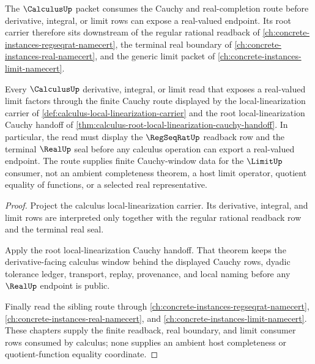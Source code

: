 The $\CalculusUp$ packet consumes the Cauchy and real-completion route before derivative, integral, or limit rows can expose a real-valued endpoint. Its root carrier therefore sits downstream of the regular rational readback of \autoref{ch:concrete-instances-regseqrat-namecert}, the terminal real boundary of \autoref{ch:concrete-instances-real-namecert}, and the generic limit packet of \autoref{ch:concrete-instances-limit-namecert}.

\begin{theorem}
\label{thm:calculus-cauchy-dependency-route}
Every $\CalculusUp$ derivative, integral, or limit read that exposes a real-valued limit factors through the finite Cauchy route displayed by the local-linearization carrier of \autoref{def:calculus-local-linearization-carrier} and the root local-linearization Cauchy handoff of \autoref{thm:calculus-root-local-linearization-cauchy-handoff}. In particular, the read must display the $\RegSeqRatUp$ readback row and the terminal $\RealUp$ seal before any calculus operation can export a real-valued endpoint. The route supplies finite Cauchy-window data for the $\LimitUp$ consumer, not an ambient completeness theorem, a host limit operator, quotient equality of functions, or a selected real representative.
\end{theorem}
\begin{proof}
Project the calculus local-linearization carrier. Its derivative, integral, and limit rows are interpreted only together with the regular rational readback row and the terminal real seal.

Apply the root local-linearization Cauchy handoff. That theorem keeps the derivative-facing calculus window behind the displayed Cauchy rows, dyadic tolerance ledger, transport, replay, provenance, and local naming before any $\RealUp$ endpoint is public.

Finally read the sibling route through \autoref{ch:concrete-instances-regseqrat-namecert}, \autoref{ch:concrete-instances-real-namecert}, and \autoref{ch:concrete-instances-limit-namecert}. These chapters supply the finite readback, real boundary, and limit consumer rows consumed by calculus; none supplies an ambient host completeness or quotient-function equality coordinate.
\end{proof}

